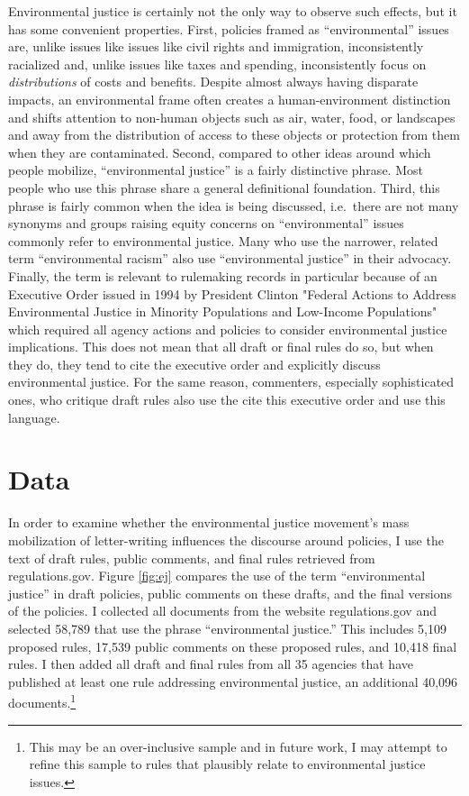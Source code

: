 \documentclass[
      12pt,
        ]{article}
\begin{document}
Environmental justice is certainly not the only way to observe such
effects, but it has some convenient properties. First, policies framed
as ``environmental'' issues are, unlike issues like issues like civil
rights and immigration, inconsistently racialized and, unlike issues
like taxes and spending, inconsistently focus on \emph{distributions} of
costs and benefits. Despite almost always having disparate impacts, an
environmental frame often creates a human-environment distinction and
shifts attention to non-human objects such as air, water, food, or
landscapes and away from the distribution of access to these objects or
protection from them when they are contaminated. Second, compared to
other ideas around which people mobilize, ``environmental justice'' is a
fairly distinctive phrase. Most people who use this phrase share a
general definitional foundation. Third, this phrase is fairly common
when the idea is being discussed, i.e.~there are not many synonyms and
groups raising equity concerns on ``environmental'' issues commonly refer
to environmental justice. Many who use the narrower, related term
``environmental racism'' also use ``environmental justice'' in their
advocacy. Finally, the term is relevant to rulemaking records in
particular because of an Executive Order issued in 1994 by President
Clinton "Federal Actions to Address Environmental Justice in Minority
Populations and Low-Income Populations" which required all agency
actions and policies to consider environmental justice implications.
This does not mean that all draft or final rules do so, but when they
do, they tend to cite the executive order and explicitly discuss
environmental justice. For the same reason, commenters, especially
sophisticated ones, who critique draft rules also use the cite this
executive order and use this language.

\hypertarget{data}{%
\section{Data}\label{data}}

In order to examine whether the environmental justice movement's mass
mobilization of letter-writing influences the discourse around policies,
I use the text of draft rules, public comments, and final rules
retrieved from regulations.gov. Figure
\ref{fig:ej} compares
the use of the term ``environmental justice'' in draft policies, public
comments on these drafts, and the final versions of the policies. I
collected all documents from the website regulations.gov and selected
58,789 that use the phrase ``environmental justice.'' This includes 5,109
proposed rules, 17,539 public comments on these proposed rules, and
10,418 final rules. I then added all draft and final rules from all 35
agencies that have published at least one rule addressing environmental
justice, an additional 40,096 documents.\footnote{This may be an over-inclusive sample and in future work, I may
  attempt to refine this sample to rules that plausibly relate to
  environmental justice issues.}
\end{document}
